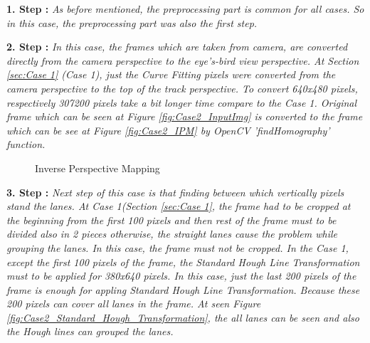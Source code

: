 \textbf{1. Step : }\emph{\color{blue}As before mentioned, the preprocessing part is common for all cases. So in this case, the preprocessing part was also the first step.}

\textbf{2. Step : }\emph{\color{blue}In this case, the frames which are taken from camera, are converted directly from the camera perspective to the eye's-bird view perspective. At Section \ref{sec:Case 1} (Case 1), just the Curve Fitting pixels were converted from the camera perspective to the top of the track perspective. To convert 640x480 pixels, respectively 307200 pixels take a bit longer time compare to the Case 1. Original frame which can be seen at Figure \ref{fig:Case2_InputImg} is converted to the frame which can be see at Figure \ref{fig:Case2_IPM} by OpenCV 'findHomography' function.}

 
\begin{figure}[H]
  \centering
  \hfill
  \caption{Inverse Perspective Mapping}
\end{figure} 


\textbf{3. Step : }\emph{\color{blue}Next step of this case is that finding between which vertically pixels stand the lanes. At Case 1(Section \ref{sec:Case 1}, the frame had to be cropped at the beginning from the first 100 pixels and then rest of the frame must to be divided also in 2 pieces otherwise, the straight lanes cause the problem while grouping the lanes. In this case, the frame must not be cropped. In the Case 1, except the first 100 pixels of the frame, the Standard Hough Line Transformation must to be applied for 380x640 pixels. In this case, just the last 200 pixels of the frame is enough for appling Standard Hough Line Transformation. Because these 200 pixels can cover all lanes in the frame. At seen Figure \ref{fig:Case2_Standard_Hough_Transformation}, the all lanes can be seen and also the Hough lines can grouped the lanes.}   


